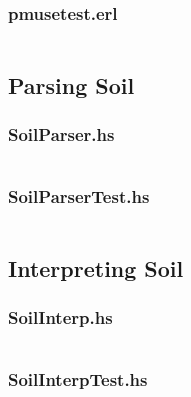 \documentclass[11pt,a4paper]{article}
\begin{document}
\subsubsection{pmusetest.erl}
\inputminted{erlang}{src/pm/pmusetest.erl}

\subsection{Parsing Soil}
\subsubsection{SoilParser.hs}
\inputminted{haskell}{src/soil/SoilParser.hs}
\subsubsection{SoilParserTest.hs}
\inputminted{haskell}{src/soil/SoilParserTest.hs}

\subsection{Interpreting Soil}
\subsubsection{SoilInterp.hs}
\inputminted{haskell}{src/soil/SoilInterp.hs}
\subsubsection{SoilInterpTest.hs}
\inputminted{haskell}{src/soil/SoilInterpTest.hs}
\end{document}
